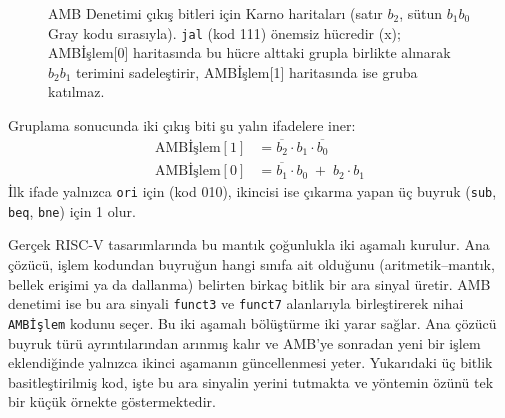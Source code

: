 \begin{figure}[htbp]
\caption[AMB Denetimi çıkış bitleri için Karno haritaları]{AMB Denetimi çıkış bitleri için Karno haritaları (satır $b_2$, sütun $b_1b_0$ Gray kodu sırasıyla). \texttt{jal} (kod 111) önemsiz hücredir (x); AMBİşlem[0] haritasında bu hücre alttaki grupla birlikte alınarak $b_2 b_1$ terimini sadeleştirir, AMBİşlem[1] haritasında ise gruba katılmaz.}
\label{fig:amb-karno}
\end{figure}

Gruplama sonucunda iki çıkış biti şu yalın ifadelere iner:
\begin{align*}
\text{AMBİşlem}[1] &= \overline{b_2}\cdot b_1 \cdot \overline{b_0} \\
\text{AMBİşlem}[0] &= \overline{b_1}\cdot b_0 \;+\; b_2 \cdot b_1
\end{align*}
İlk ifade yalnızca \texttt{ori} için (kod 010), ikincisi ise çıkarma yapan üç buyruk (\texttt{sub}, \texttt{beq}, \texttt{bne}) için 1 olur.

Gerçek RISC-V tasarımlarında bu mantık çoğunlukla iki aşamalı kurulur. Ana çözücü, işlem kodundan buyruğun hangi sınıfa ait olduğunu (aritmetik--mantık, bellek erişimi ya da dallanma) belirten birkaç bitlik bir ara sinyal üretir. AMB denetimi ise bu ara sinyali \texttt{funct3} ve \texttt{funct7} alanlarıyla birleştirerek nihai \texttt{AMBİşlem} kodunu seçer. Bu iki aşamalı bölüştürme iki yarar sağlar. Ana çözücü buyruk türü ayrıntılarından arınmış kalır ve AMB'ye sonradan yeni bir işlem eklendiğinde yalnızca ikinci aşamanın güncellenmesi yeter. Yukarıdaki üç bitlik basitleştirilmiş kod, işte bu ara sinyalin yerini tutmakta ve yöntemin özünü tek bir küçük örnekte göstermektedir.


